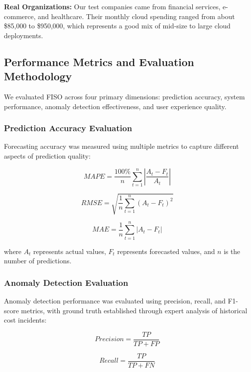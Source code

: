 \documentclass[conference]{IEEEtran}
\begin{document}
\textbf{Real Organizations:} Our test companies came from financial services, e-commerce, and healthcare. Their monthly cloud spending ranged from about \$85,000 to \$950,000, which represents a good mix of mid-size to large cloud deployments.

\subsection{Performance Metrics and Evaluation Methodology}

We evaluated FISO across four primary dimensions: prediction accuracy, system performance, anomaly detection effectiveness, and user experience quality.

\subsubsection{Prediction Accuracy Evaluation}

Forecasting accuracy was measured using multiple metrics to capture different aspects of prediction quality:

\begin{equation}
MAPE = \frac{100\%}{n} \sum_{t=1}^{n} \left|\frac{A_t - F_t}{A_t}\right|
\end{equation}

\begin{equation}
RMSE = \sqrt{\frac{1}{n} \sum_{t=1}^{n} (A_t - F_t)^2}
\end{equation}

\begin{equation}
MAE = \frac{1}{n} \sum_{t=1}^{n} |A_t - F_t|
\end{equation}

where $A_t$ represents actual values, $F_t$ represents forecasted values, and $n$ is the number of predictions.

\subsubsection{Anomaly Detection Evaluation}

Anomaly detection performance was evaluated using precision, recall, and F1-score metrics, with ground truth established through expert analysis of historical cost incidents:

\begin{equation}
Precision = \frac{TP}{TP + FP}
\end{equation}

\begin{equation}
Recall = \frac{TP}{TP + FN}
\end{equation}
\end{document}
